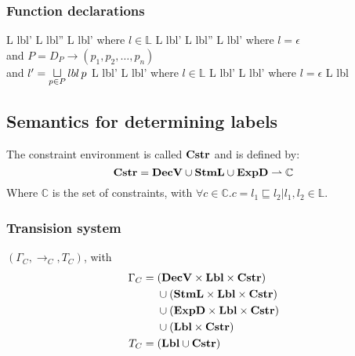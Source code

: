 \subsubsection{Function declarations}

\begin{trules}
        { {L} {lbl'} }
        { {L} {lbl''} \;\;  {L} {lbl'} }
        {where $l \in \mathbb{L}$}
        { {L} {lbl'} }
        { {L} {lbl''} \;  {L} {lbl'} }
        {where $l = \epsilon$\\
        and $P = D_P \rightarrow (p_1, p_2, \dots, p_n)$\\
        and $l' = \sqcupl\limits_{p \in P} lbl \, p$}
        { {L} {lbl'} }
        { {L} {lbl'} }
        {where $l \in \mathbb{L}$}
        { {L} {lbl'} }
        { {L} {lbl'} }
        {where $l = \epsilon$}
        { {L} {lbl} }
        {}
        {}
\end{trules}

\subsection{Semantics for determining labels}
The constraint environment is called $\mathbf{Cstr}$ and is defined by:
\[
  \mathbf{Cstr} = \mathbf{DecV} \cup \mathbf{StmL} \cup \mathbf{ExpD} \rightharpoonup \mathbb{C}
\]
Where $\mathbb{C}$ is the set of constraints, with $\forall c \in \mathbb{C} . c = l_1 \sqsubseteq l_2 | l_1, l_2 \in \mathbb{L}$.

\subsubsection{Transision system}
$(\Gamma_{C}, \rightarrow_{C}, T_{C})$, with
\begin{align*}
  \Gamma_{C} =  & \;        (\mathbf{DecV} \times \mathbf{Lbl} \times \mathbf{Cstr}) \\
                & \;  \cup  (\mathbf{StmL} \times \mathbf{Lbl} \times \mathbf{Cstr}) \\
                & \;  \cup  (\mathbf{ExpD} \times \mathbf{Lbl} \times \mathbf{Cstr}) \\
                & \;  \cup  (\mathbf{Lbl} \times \mathbf{Cstr})               \\
  T_{C} =       & \;  (\mathbf{Lbl} \cup \mathbf{Cstr})
\end{align*}

